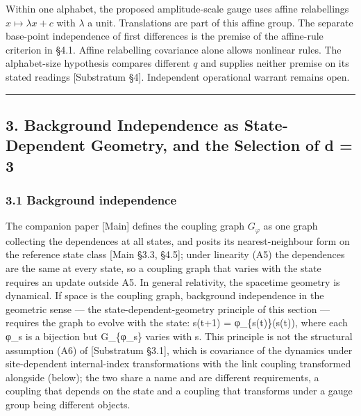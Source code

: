 \documentclass[
]{article}
\begin{document}
Within one alphabet, the proposed amplitude-scale gauge uses affine
relabellings \(x\mapsto\lambda x+c\) with \(\lambda\) a unit.
Translations are part of this affine group. The separate base-point
independence of first differences is the premise of the affine-rule
criterion in §4.1. Affine relabelling covariance alone allows nonlinear
rules. The alphabet-size hypothesis compares different \(q\) and
supplies neither premise on its stated readings {[}Substratum §4{]}.
Independent operational warrant remains open.

\begin{center}\rule{0.5\linewidth}{0.5pt}\end{center}

\hypertarget{background-independence-as-state-dependent-geometry-and-the-selection-of-d-3}{%
\subsection{3. Background Independence as State-Dependent Geometry, and
the Selection of d =
3}\label{background-independence-as-state-dependent-geometry-and-the-selection-of-d-3}}

\hypertarget{background-independence}{%
\subsubsection{3.1 Background
independence}\label{background-independence}}

The companion paper {[}Main{]} defines the coupling graph \(G_\varphi\)
as one graph collecting the dependences at all states, and posits its
nearest-neighbour form on the reference state class {[}Main §3.3,
§4.5{]}; under linearity (A5) the dependences are the same at every
state, so a coupling graph that varies with the state requires an update
outside A5. In general relativity, the spacetime geometry is dynamical.
If space is the coupling graph, background independence in the geometric
sense --- the state-dependent-geometry principle of this section ---
requires the graph to evolve with the state: s(t+1) = φ\_\{s(t)\}(s(t)),
where each φ\_s is a bijection but G\_\{φ\_s\} varies with s. This
principle is not the structural assumption (A6) of {[}Substratum
§3.1{]}, which is covariance of the dynamics under site-dependent
internal-index transformations with the link coupling transformed
alongside (below); the two share a name and are different requirements,
a coupling that depends on the state and a coupling that transforms
under a gauge group being different objects.
\end{document}
